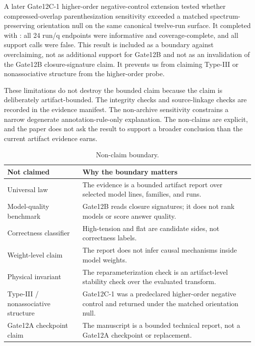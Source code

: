 \documentclass[11pt]{article}
\newcommand{\code}[1]{\texttt{\detokenize{#1}}}
\begin{document}
A later Gate12C-1 higher-order negative-control extension tested whether
compressed-overlap parenthesization sensitivity exceeded a matched
spectrum-preserving orientation null on the same canonical twelve-run surface.
It completed with \code{no_directional_support}: all 24 run/q endpoints were
informative and coverage-complete, and all support calls were false. This result
is included as a boundary against overclaiming, not as additional support for
Gate12B and not as an invalidation of the Gate12B closure-signature claim. It
prevents us from claiming Type-III or nonassociative structure from the
higher-order probe.

These limitations do not destroy the bounded claim because the claim is
deliberately artifact-bounded. The integrity checks and source-linkage checks
are recorded in the evidence manifest. The non-archive sensitivity constrains a
narrow degenerate annotation-rule-only explanation. The non-claims are explicit,
and the paper does not ask the result to support a broader conclusion than the
current artifact evidence earns.

\begin{table}[ht]
\centering
\small
\caption{Non-claim boundary.}
\label{tab:nonclaims}
\begin{tabular}{|>{\raggedright\arraybackslash}p{}|>{\raggedright\arraybackslash}p{}|}
\hline
Not claimed & Why the boundary matters \\
\hline
Universal law & The evidence is a bounded artifact report over selected model lines, families, and runs. \\
\hline
Model-quality benchmark & Gate12B reads closure signatures; it does not rank models or score answer quality. \\
\hline
Correctness classifier & High-tension and flat are candidate sides, not correctness labels. \\
\hline
Weight-level claim & The report does not infer causal mechanisms inside model weights. \\
\hline
Physical invariant & The reparameterization check is an artifact-level stability check over the evaluated transform. \\
\hline
Type-III / nonassociative structure & Gate12C-1 was a predeclared higher-order negative control and returned \code{no_directional_support} under the matched orientation null. \\
\hline
Gate12A checkpoint claim & The manuscript is a bounded technical report, not a Gate12A checkpoint or replacement. \\
\hline
\end{tabular}
\end{table}
\end{document}
